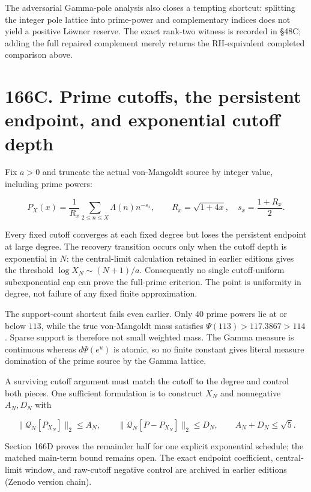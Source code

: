 \documentclass[
  11pt,
]{book}
\begin{document}
The adversarial Gamma-pole analysis also closes a tempting shortcut:
splitting the integer pole lattice into prime-power and complementary
indices does not yield a positive Löwner reserve. The exact rank-two
witness is recorded in §48C; adding the full repaired complement merely
returns the RH-equivalent completed comparison above.

\section{166C. Prime cutoffs, the persistent endpoint, and exponential
cutoff
depth}\label{c.-prime-cutoffs-the-persistent-endpoint-and-exponential-cutoff-depth}

Fix \(a>0\) and truncate the actual von-Mangoldt source by integer
value, including prime powers:

\[
P_X(x)=\frac1{R_x}\sum_{2\le n\le X}\Lambda(n)n^{-s_x},
\qquad R_x=\sqrt{1+4x},\quad s_x=\frac{1+R_x}{2}.
\tag{166C.1}
\]

Every fixed cutoff converges at each fixed degree but loses the
persistent endpoint at large degree. The recovery transition occurs only
when the cutoff depth is exponential in \(N\): the central-limit
calculation retained in earlier editions gives the threshold
\(\log X_N\sim (N+1)/a\). Consequently no single cutoff-uniform
subexponential cap can prove the full-prime criterion. The point is
uniformity in degree, not failure of any fixed finite approximation.

The support-count shortcut fails even earlier. Only \(40\) prime powers
lie at or below \(113\), while the true von-Mangoldt mass satisfies
\(\Psi(113)>117.3867>114\). Sparse support is therefore not small
weighted mass. The Gamma measure is continuous whereas \(d\Psi(e^u)\) is
atomic, so no finite constant gives literal measure domination of the
prime source by the Gamma lattice.

A surviving cutoff argument must match the cutoff to the degree and
control both pieces. One sufficient formulation is to construct \(X_N\)
and nonnegative \(A_N,D_N\) with

\[
\boxed{\ \|\mathcal Q_N[P_{X_N}]\|_2\le A_N,\qquad
\|\mathcal Q_N[P-P_{X_N}]\|_2\le D_N,\qquad
A_N+D_N\le\sqrt5.\ }
\tag{166C.25}
\]

Section 166D proves the remainder half for one explicit exponential
schedule; the matched main-term bound remains open. The exact endpoint
coefficient, central-limit window, and raw-cutoff negative control are
archived in earlier editions (Zenodo version chain).
\end{document}
